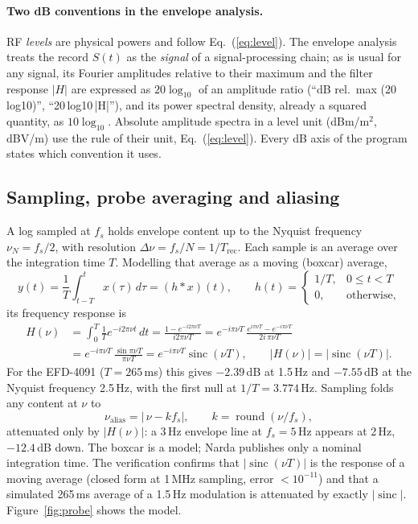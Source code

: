 \documentclass[10pt,letterpaper]{article}
\numberwithin{equation}{section}
\DeclareMathOperator{\sinc}{sinc}
\begin{document}
\paragraph{Two dB conventions in the envelope analysis.}
RF \emph{levels} are physical powers and follow Eq.~(\ref{eq:level}). The
envelope analysis treats the record $S(t)$ as the \emph{signal} of a
signal-processing chain; as is usual for any signal, its Fourier amplitudes
relative to their maximum and the filter response $|H|$ are expressed as
$20\log_{10}$ of an amplitude ratio (``dB rel.\ max (20\,log10)'',
``20\,log10\,|H|''), and its power spectral density, already a squared quantity,
as $10\log_{10}$. Absolute amplitude spectra in a level unit (dBm/m$^2$,
dB\textmu V/m) use the rule of their unit, Eq.~(\ref{eq:level}). Every dB axis of
the program states which convention it uses.

\subsection{Sampling, probe averaging and aliasing}\label{sec:sinc}
A log sampled at $f_s$ holds envelope content up to the Nyquist frequency
$\nu_N = f_s/2$, with resolution $\Delta\nu = f_s/N = 1/T_\mathrm{rec}$. Each
sample is an average over the integration time $T$. Modelling that average as
a moving (boxcar) average,
\begin{equation}
y(t) = \frac{1}{T}\int_{t-T}^{t} x(\tau)\,d\tau = (h * x)(t),\qquad
h(t) = \begin{cases} 1/T, & 0 \le t < T\\ 0, & \text{otherwise,}\end{cases}
\end{equation}
its frequency response is
\begin{align}
H(\nu) &= \int_0^T \frac{1}{T} e^{-i2\pi\nu t}\,dt
 = \frac{1 - e^{-i2\pi\nu T}}{i2\pi\nu T}
 = e^{-i\pi\nu T}\,\frac{e^{i\pi\nu T} - e^{-i\pi\nu T}}{2i\,\pi\nu T} \nonumber\\
&= e^{-i\pi\nu T}\,\frac{\sin \pi\nu T}{\pi\nu T} = e^{-i\pi\nu T}\sinc(\nu T),
\qquad |H(\nu)| = |\sinc(\nu T)|.
\label{eq:sinc}
\end{align}
For the EFD-4091 ($T = 265$\,ms) this gives $-2.39$\,dB at 1.5\,Hz and
$-7.55$\,dB at the Nyquist frequency 2.5\,Hz, with the first null at
$1/T = 3.774$\,Hz. Sampling folds any content at $\nu$ to
\begin{equation}
\nu_\mathrm{alias} = \left|\,\nu - k f_s\right|,\qquad k = \operatorname{round}(\nu/f_s),
\end{equation}
attenuated only by $|H(\nu)|$: a 3\,Hz envelope line at $f_s = 5$\,Hz appears
at 2\,Hz, $-12.4$\,dB down. The boxcar is a model; Narda publishes only a
nominal integration time. The verification confirms that $|\sinc(\nu T)|$ is
the response of a moving average (closed form at 1\,MHz sampling, error
$<10^{-11}$) and that a simulated 265\,ms average of a 1.5\,Hz modulation is
attenuated by exactly $|\sinc|$. Figure~\ref{fig:probe} shows the model.
\end{document}
